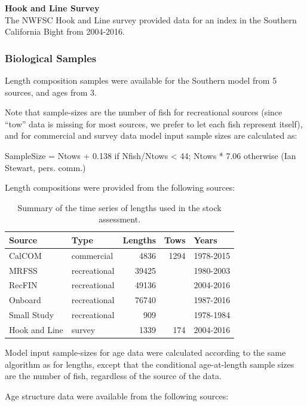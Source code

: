 \documentclass[12pt,]{article}
\begin{document}
\textbf{Hook and Line Survey}\\
The NWFSC Hook and Line survey provided data for an index in the
Southern California Bight from 2004-2016.

\subsubsection{Biological Samples}\label{biological-samples-1}

Length composition samples were available for the Southern model from 5
sources, and ages from 3.

Note that sample-sizes are the number of fish for recreational sources
(since ``tow'' data is missing for most sources, we prefer to let each
fish represent itself), and for commercial and survey data model input
sample sizes are calculated as:

SampleSize = Ntows + 0.138 if Nfish/Ntows \textless{} 44; Ntows * 7.06
otherwise (Ian Stewart, pers. comm.)

Length compositions were provided from the following sources:

\begin{table}[ht]
\centering
\caption{Summary of the time series of lengths used in the stock assessment.} 
\label{tab:Length_sources}
\begin{tabular}{llrrl}
  \hline
Source & Type & Lengths & Tows & Years \\ 
  \hline
CalCOM & commercial & 4836 & 1294 & 1978-2015 \\ 
  MRFSS & recreational & 39425 &  & 1980-2003 \\ 
  RecFIN & recreational & 49136 &  & 2004-2016 \\ 
  Onboard & recreational & 76740 &  & 1987-2016 \\ 
  Small Study & recreational & 909 &  & 1978-1984 \\ 
  Hook and Line & survey & 1339 & 174 & 2004-2016 \\ 
   \hline
\end{tabular}
\end{table}

Model input sample-sizes for age data were calculated according to the
same algorithm as for lengths, except that the conditional age-at-length
sample sizes are the number of fish, regardless of the source of the
data.

Age structure data were available from the following sources:
\end{document}
